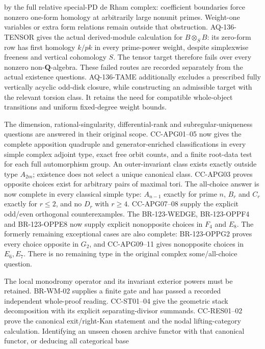 \begin{description}[style=nextline,leftmargin=0pt]
by the full relative special-PD de Rham complex: coefficient
boundaries force nonzero one-form homology at arbitrarily large
nonunit primes. Weight-one variables or extra form relations
remain outside that obstruction.
AQ-136-TENSOR gives the actual derived-module calculation for
$B\otimes_S B$: its zero-form row has first homology $k/pk$
in every prime-power weight, despite simplexwise freeness and vertical
cohomology $S$. The tensor target therefore fails over every nonzero
non-$\mathbf Q$-algebra. These failed routes are recorded
separately from the actual existence questions.
AQ-136-TAME additionally excludes a prescribed fully vertically
acyclic odd-disk closure, while constructing an admissible target
with the relevant torsion class. It retains the need for compatible
whole-object transitions and uniform fixed-degree weight bounds.
\item[Cote 123: the original apposition questions are now closed.]
The dimension, rational-singularity, differential-rank and
subregular-uniqueness questions are answered in their original scope.
CC-APG01--05 now gives the complete apposition quadruple and
generator-enriched classifications in every simple complex adjoint
type, exact free orbit counts, and a finite root-data test for each
full automorphism group. An outer-invariant class exists exactly
outside type $A_{2m}$; existence does not select a unique canonical
class. CC-APG03 proves opposite choices exist for arbitrary pairs of
maximal tori. The all-choice answer is now complete in every classical simple
type: $A_{n-1}$ exactly for prime $n$, $B_r$ and $C_r$ exactly
for $r\leq2$, and no $D_r$ with $r\geq4$. CC-APG07--08
supply the explicit odd/even orthogonal counterexamples. The
BR-123-WEDGE, BR-123-OPPF4 and BR-123-OPPE8 now supply
explicit nonopposite choices in $F_4$ and $E_8$.  The formerly remaining
exceptional cases are also complete: BR-123-OPPG2 proves every
choice opposite in $G_2$, and CC-APG09--11 gives nonopposite
choices in $E_6,E_7$. There is no remaining type in the original
complex some/all-choice question.
\item[Weight--monodromy and universal-curve categories.]
The local monodromy operator and its invariant exterior powers must
be retained. BR-WM-02 supplies a finite gate and has passed a
recorded independent whole-proof reading. CC-ST01--04 give the geometric
stack decomposition with its explicit separating-divisor summands.
CC-RES01--02 prove the canonical exit/right-Kan statement and the nodal
lifting-category calculation. Identifying an unseen chosen archive
functor with that canonical functor, or deducing all categorical base

\end{description}
